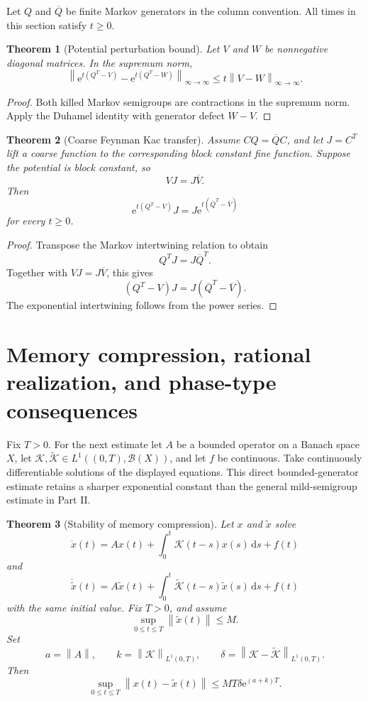 \documentclass[11pt,letterpaper]{article}
\newtheorem{theorem}{Theorem}[section]
\theoremstyle{plain}
\theoremstyle{plain}
\theoremstyle{plain}
\theoremstyle{definition}
\theoremstyle{definition}
\theoremstyle{definition}
\theoremstyle{definition}
\theoremstyle{definition}
\theoremstyle{remark}
\theoremstyle{remark}
\theoremstyle{remark}
\theoremstyle{remark}
\theoremstyle{remark}
\newcommand{\norm}[1]{\left\lVert#1\right\rVert}
\theoremstyle{remark}
\newcommand{\Kcal}{\mathcal K}
\newcommand{\e}{\mathrm e}
\newcommand{\dd}{\,\mathrm d}
\let\KomorebiPrimitiveMathcal\mathcal
\renewcommand{\mathcal}[1]{{\KomorebiPrimitiveMathcal{#1}}}
\let\KomorebiPrimitivemathrm\mathrm
\renewcommand{\mathrm}[1]{{\KomorebiPrimitivemathrm{#1}}}
\begin{document}
Let $Q$ and $\overline Q$ be finite Markov generators in the column convention. All times in this section satisfy $t\geq0$.
\begin{theorem}[Potential perturbation bound]\label{earlier:record:019}\label{earlier:thm:feynman_kac_potential_bound}
Let \(V\) and \(W\) be nonnegative diagonal matrices. In the supremum norm,
\[
\boxed{
\norm{
\e^{t(Q^T-V)}
-
\e^{t(Q^T-W)}
}_{\infty\to\infty}
\leq
 t\norm{V-W}_{\infty\to\infty}.
}
\]
\end{theorem}

\begin{proof}
Both killed Markov semigroups are contractions in the supremum norm. Apply the Duhamel identity with generator defect \(W-V\).
\end{proof}

\begin{theorem}[Coarse Feynman Kac transfer]\label{earlier:record:020}\label{earlier:thm:coarse_feynman_kac}
Assume \(CQ=\overline QC\), and let \(J=C^T\) lift a coarse function to the corresponding block constant fine function. Suppose the potential is block constant, so
\[
VJ=J\overline V.
\]
Then
\[
\boxed{
\e^{t(Q^T-V)}J
=
J\e^{t(\overline Q^T-\overline V)}
}
\]
for every \(t\geq0\).
\end{theorem}

\begin{proof}
Transpose the Markov intertwining relation to obtain
\[
Q^TJ=J\overline Q^T.
\]
Together with \(VJ=J\overline V\), this gives
\[
(Q^T-V)J=J(\overline Q^T-\overline V).
\]
The exponential intertwining follows from the power series.
\end{proof}


\FloatBarrier
\section{Memory compression, rational realization, and phase-type consequences}\label{earlier:section:05}
Fix $T>0$. For the next estimate let $A$ be a bounded operator on a Banach space $X$, let $\Kcal,\widetilde\Kcal\in L^1((0,T),\mathcal B(X))$, and let $f$ be continuous. Take continuously differentiable solutions of the displayed equations. This direct bounded-generator estimate retains a sharper exponential constant than the general mild-semigroup estimate in Part II.
\begin{theorem}[Stability of memory compression]\label{earlier:record:021}\label{earlier:thm:memory_compression_stability}
Let \(x\) and \(\widetilde x\) solve
\[
\dot x(t)
=Ax(t)+\int_0^t\Kcal(t-s)x(s)\dd s+f(t)
\]
and
\[
\dot{\widetilde x}(t)
=A\widetilde x(t)
+\int_0^t\widetilde\Kcal(t-s)\widetilde x(s)\dd s
+f(t)
\]
with the same initial value. Fix \(T>0\), and assume
\[
\sup_{0\leq t\leq T}\norm{\widetilde x(t)}\leq M.
\]
Set
\[
a=\norm A,
\qquad
k=\norm{\Kcal}_{L^1(0,T)},
\qquad
\delta=\norm{\Kcal-\widetilde\Kcal}_{L^1(0,T)}.
\]
Then
\[
\boxed{
\sup_{0\leq t\leq T}
\norm{x(t)-\widetilde x(t)}
\leq
MT\delta\e^{(a+k)T}.
}
\]
\end{theorem}
\end{document}
